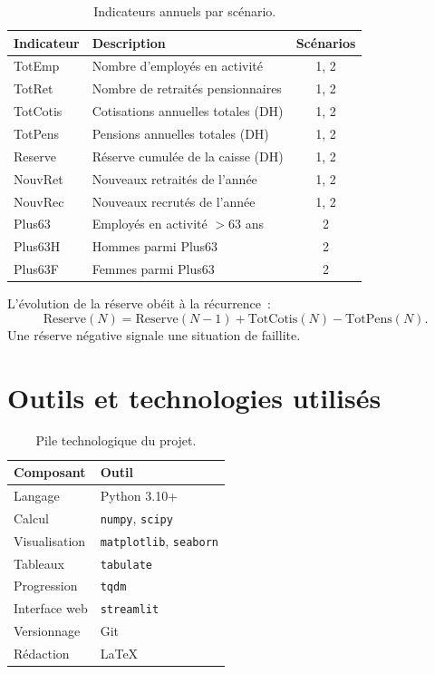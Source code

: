 \documentclass[12pt,a4paper,oneside]{report}
\newcommand{\code}[1]{\texttt{\color{primary}#1}}
\begin{document}
\begin{table}[H]
\centering
\caption{Indicateurs annuels par scénario.}
\label{tab:indicateurs}
\begin{tabularx}{\linewidth}{lXc}
\toprule
\textbf{Indicateur} & \textbf{Description} & \textbf{Scénarios} \\
\midrule
TotEmp     & Nombre d'employés en activité & 1, 2 \\
TotRet     & Nombre de retraités pensionnaires & 1, 2 \\
TotCotis   & Cotisations annuelles totales (DH) & 1, 2 \\
TotPens    & Pensions annuelles totales (DH) & 1, 2 \\
Reserve    & Réserve cumulée de la caisse (DH) & 1, 2 \\
NouvRet    & Nouveaux retraités de l'année & 1, 2 \\
NouvRec    & Nouveaux recrutés de l'année & 1, 2 \\
Plus63     & Employés en activité $> 63$ ans & 2 \\
Plus63H    & Hommes parmi Plus63 & 2 \\
Plus63F    & Femmes parmi Plus63 & 2 \\
\bottomrule
\end{tabularx}
\end{table}

L'évolution de la réserve obéit à la récurrence~:
\[
\text{Reserve}(N) = \text{Reserve}(N-1) + \text{TotCotis}(N) - \text{TotPens}(N).
\]
Une réserve négative signale une situation de faillite.

\section{Outils et technologies utilisés}

\begin{table}[H]
\centering
\caption{Pile technologique du projet.}
\label{tab:tech}
\begin{tabularx}{\linewidth}{lX}
\toprule
\textbf{Composant} & \textbf{Outil} \\
\midrule
Langage         & Python 3.10+ \\
Calcul          & \code{numpy}, \code{scipy} \\
Visualisation   & \code{matplotlib}, \code{seaborn} \\
Tableaux        & \code{tabulate} \\
Progression     & \code{tqdm} \\
Interface web   & \code{streamlit} \\
Versionnage     & Git \\
Rédaction       & \LaTeX{} \\
\bottomrule
\end{tabularx}
\end{table}
\end{document}
